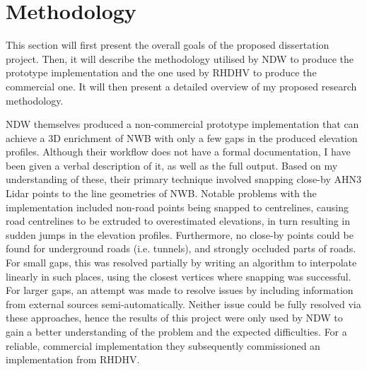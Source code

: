 
\section{Methodology}
\label{sec:m}

This section will first present the overall goals of the proposed dissertation project. Then, it will describe the methodology utilised by NDW to produce the prototype implementation and the one used by RHDHV to produce the commercial one. It will then present a detailed overview of my proposed research methodology.

NDW themselves produced a non-commercial prototype implementation that can achieve a 3D enrichment of NWB with only a few gaps in the produced elevation profiles. Although their workflow does not have a formal documentation, I have been given a verbal description of it, as well as the full output. Based on my understanding of these, their primary technique involved snapping close-by AHN3 Lidar points to the line geometries of NWB. Notable problems with the implementation included non-road points being snapped to centrelines, causing road centrelines to be extruded to overestimated elevations, in turn resulting in sudden jumps in the elevation profiles. Furthermore, no close-by points could be found for underground roads (i.e. tunnels), and strongly occluded parts of roads. For small gaps, this was resolved partially by writing an algorithm to interpolate linearly in such places, using the closest vertices where snapping was successful. For larger gaps, an attempt was made to resolve issues by including information from external sources semi-automatically. Neither issue could be fully resolved via these approaches, hence the results of this project were only used by NDW to gain a better understanding of the problem and the expected difficulties. For a reliable, commercial implementation they subsequently commissioned an implementation from RHDHV.

